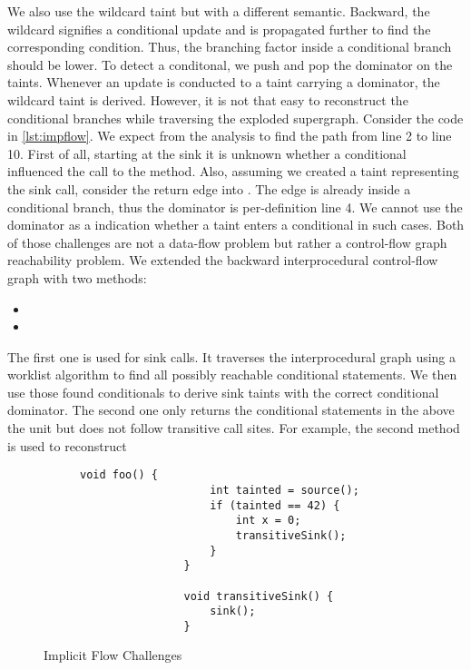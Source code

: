 \documentclass[../draft.tex]{subfiles}
\begin{document}
    We also use the wildcard taint but with a different semantic.
    Backward, the wildcard signifies a conditional update and is propagated further to find the corresponding condition.
    Thus, the branching factor inside a conditional branch should be lower.
    To detect a conditonal, we push and pop the dominator on the taints.
    Whenever an update is conducted to a taint carrying a dominator, the wildcard taint is derived.
    However, it is not that easy to reconstruct the conditional branches while traversing the exploded supergraph.
    Consider the code in \autoref{lst:impflow}.
    We expect from the analysis to find the path from line 2 to line 10.
    First of all, starting at the sink it is unknown whether a conditional influenced the call to the  method.
    Also, assuming we created a taint representing the sink call, consider the return edge into .
    The edge is already inside a conditional branch, thus the dominator is per-definition line 4.
    We cannot use the dominator as a indication whether a taint enters a conditional in such cases.
    Both of those challenges are not a data-flow problem but rather a control-flow graph reachability problem.
    We extended the backward interprocedural control-flow graph with two methods:
    \begin{itemize}
        \item {}
        \item {}
    \end{itemize}
    The first one is used for sink calls.
    It traverses the interprocedural graph using a worklist algorithm to find all possibly reachable conditional statements.
    We then use those found conditionals to derive sink taints with the correct conditional dominator.
    The second one only returns the conditional statements in the above the unit but does not follow transitive call sites.
    For example, the second method is used to reconstruct 

    \begin{figure}[tbp]
        \centering
        \begin{subfigure}[b]{0.45\textwidth}
            \centering
            \begin{lstlisting}[gobble=16]
                void foo() {
                    int tainted = source();
                    if (tainted == 42) {
                        int x = 0;
                        transitiveSink();
                    }
                }

                void transitiveSink() {
                    sink();
                }
            \end{lstlisting}
        \end{subfigure}
        \caption{Implicit Flow Challenges}
        \label{lst:impflow}
    \end{figure}
\end{document}
